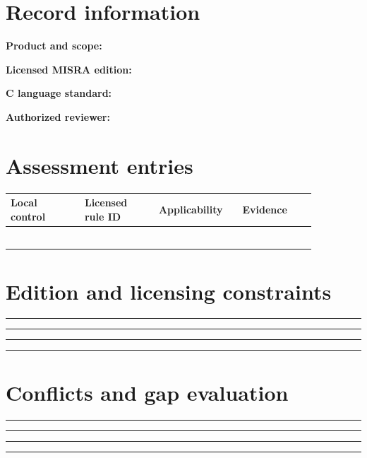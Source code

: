 \documentclass[10pt,letterpaper]{article}
\begin{document}
\makedoctitle
\makedocsummary
\section{Record information}
\noindent\textbf{Product and scope:}\quad\hrulefill\par\vspace{11pt}
\noindent\textbf{Licensed MISRA edition:}\quad\hrulefill\par\vspace{11pt}
\noindent\textbf{C language standard:}\quad\hrulefill\par\vspace{11pt}
\noindent\textbf{Authorized reviewer:}\quad\hrulefill\par\vspace{11pt}
\section{Assessment entries}
\begin{longtable}{|p{0.215\linewidth}|p{0.215\linewidth}|p{0.215\linewidth}|p{0.215\linewidth}|}
\hline
\textbf{Local control} & \textbf{Licensed rule ID} & \textbf{Applicability} & \textbf{Evidence}\\\hline
\endhead
\rule{0pt}{27pt} & & & \\\hline
\rule{0pt}{27pt} & & & \\\hline
\rule{0pt}{27pt} & & & \\\hline
\rule{0pt}{27pt} & & & \\\hline
\rule{0pt}{27pt} & & & \\\hline
\rule{0pt}{27pt} & & & \\\hline
\end{longtable}
\section{Edition and licensing constraints}
\noindent\rule{\linewidth}{0.4pt}\par\vspace{16pt}
\noindent\rule{\linewidth}{0.4pt}\par\vspace{16pt}
\noindent\rule{\linewidth}{0.4pt}\par\vspace{16pt}
\noindent\rule{\linewidth}{0.4pt}\par\vspace{16pt}
\section{Conflicts and gap evaluation}
\noindent\rule{\linewidth}{0.4pt}\par\vspace{16pt}
\noindent\rule{\linewidth}{0.4pt}\par\vspace{16pt}
\noindent\rule{\linewidth}{0.4pt}\par\vspace{16pt}
\noindent\rule{\linewidth}{0.4pt}\par\vspace{16pt}
\end{document}
